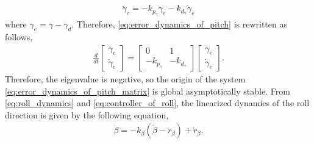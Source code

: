 \begin{align}
    \label{eq:error_dynamics_of_pitch}
    \ddot{\gamma}_e = - k_{p_{\gamma}} \gamma_e - k_{d_{\gamma}} \dot{\gamma}_e
\end{align}
where $ \gamma_e = \gamma - \gamma_d $.
Therefore, \eqref{eq:error_dynamics_of_pitch} is rewritten as follows,
\begin{align}
    \label{eq:error_dynamics_of_pitch_matrix}
    \frac{d}{dt}
    \begin{bmatrix}
        \gamma_e \\
        \dot{\gamma}_e
    \end{bmatrix}
    =
    \begin{bmatrix}
        0 & 1 \\
        - k_{p_{\gamma}} & -k_{d_{\gamma}}
    \end{bmatrix}
    \begin{bmatrix}
        \gamma_e \\
        \dot{\gamma}_e
    \end{bmatrix}.
\end{align}
Therefore, the eigenvalue is negative, so the origin of the system \eqref{eq:error_dynamics_of_pitch_matrix} is global asymptotically stable.
From \eqref{eq:roll_dynamics} and \eqref{eq:controller_of_roll}, the linearized dynamics of the roll direction is given by the following equation,
\begin{align}
    \label{eq:roll_dynamics_and_controller}
    \ddot{\beta} = - k_{\beta} (\dot{\beta} - r_{\beta}) + \dot{r}_{\beta}.
\end{align}
